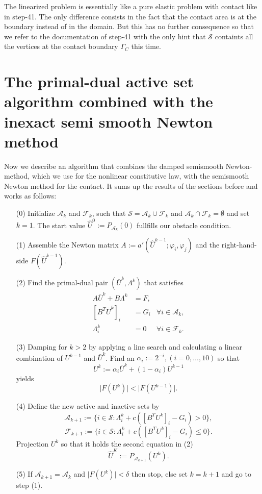 \documentclass{article}
\begin{document}
The linearized problem is essentially like a pure elastic problem with contact like
in step-41. The only difference consists in the fact that the contact area
is at the boundary instead of in the domain. But this has no further consequence
so that we refer to the documentation of step-41 with the only hint that
$\mathcal{S}$ containts all the vertices at the contact boundary $\Gamma_C$ this
time.

\section{The primal-dual active set algorithm combined with the inexact semi smooth
Newton method}

Now we describe an algorithm that combines the damped semismooth Newton-method,
which we use for the nonlinear constitutive law, with the semismooth Newton
method for the contact. It sums up the results of the sections before and works as follows:
\begin{itemize}
 \item[(0)] Initialize $\mathcal{A}_k$ and $\mathcal{F}_k$, such that
 $\mathcal{S} = \mathcal{A}_k \cup \mathcal{F}_k$ and $\mathcal{A}_k \cap
 \mathcal{F}_k = \emptyset$ and set $k = 1$. The start value $\hat U^0 :=
 P_{\mathcal{A}_k}(0)$ fullfills our obstacle condition.
 \item[(1)] Assemble the Newton matrix $A := a'(\hat
 U^{k-1};\varphi_i,\varphi_j)$ and the right-hand-side $F(\hat U^{k-1})$.
 \item[(2)] Find the primal-dual pair $(\bar U^k,\Lambda^k)$ that satisfies
 \begin{align*}
 A\bar U^k + B\Lambda^k & = F, &\\
 \left[B^T\bar U^k\right]_i & = G_i & \forall i\in\mathcal{A}_k,\\
 \Lambda^k_i & = 0 & \forall i\in\mathcal{F}_k.
 \end{align*}
 \item[(3)] Damping for $k>2$ by applying a line search and calculating a linear
 combination of $U^{k-1}$ and $\bar U^k$. Find an
 $\alpha_i:=2^{-i},(i=0,\ldots,10)$ so that $$U^k := \alpha_i\bar U^k +
 (1-\alpha_i)U^{k-1}$$ yields $$\vert
 F\left(U^{k}\right) \vert < \vert F\left(U^{k-1}\right) \vert.$$
 \item[(4)] Define the new active and inactive sets by
 $$\mathcal{A}_{k+1}:=\lbrace i\in\mathcal{S}:\Lambda^k_i +
 c\left(\left[B^TU^k\right]_i - G_i\right) > 0\rbrace,$$
 $$\mathcal{F}_{k+1}:=\lbrace i\in\mathcal{S}:\Lambda^k_i +
 c\left(\left[B^TU^k\right]_i - G_i\right) \leq 0\rbrace.$$
 Projection $U^k$ so that it holds the second equation in (2)
 $$\hat U^K := P_{\mathcal{A}_{k+1}}(U^k).$$ 
 \item[(5)] If $\mathcal{A}_{k+1} = \mathcal{A}_k$ and $\vert
 F\left(U^{k}\right) \vert < \delta$ then stop, else set $k=k+1$ and go to
 step (1).
\end{itemize}
\end{document}
